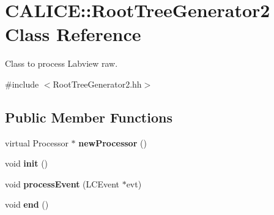 \section{CALICE::RootTreeGenerator2 Class Reference}
\label{classCALICE_1_1RootTreeGenerator2}


Class to process Labview raw.  


{\ttfamily \#include $<$RootTreeGenerator2.hh$>$}\subsection*{Public Member Functions}
\begin{DoxyCompactItemize}
\item 
virtual Processor $\ast$ {\bfseries newProcessor} ()\label{classCALICE_1_1RootTreeGenerator2_ab4853d325591a5a66bcb9ebc16cbb136}

\item 
void {\bfseries init} ()\label{classCALICE_1_1RootTreeGenerator2_a80c7d615ad996292e02080c89a7da898}

\item 
void {\bfseries processEvent} (LCEvent $\ast$evt)\label{classCALICE_1_1RootTreeGenerator2_aca785fa947fe4759fddb0d3dfc417aaa}

\item 
void {\bfseries end} ()\label{classCALICE_1_1RootTreeGenerator2_ad8313adc1a956f6c5b5d24c6174e8c7c}

\end{DoxyCompactItemize}
